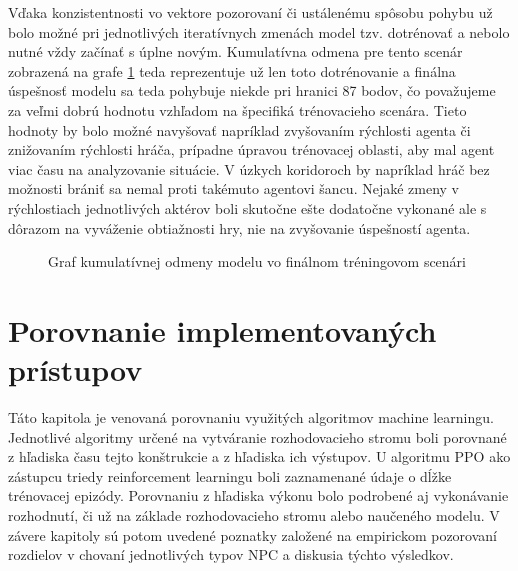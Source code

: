 \documentclass[slovak, master]{diploma}
\begin{document}
Vďaka konzistentnosti vo vektore pozorovaní či ustálenému spôsobu pohybu už bolo možné pri jednotlivých iteratívnych zmenách model tzv. dotrénovať a nebolo nutné vždy začínať s úplne novým. Kumulatívna odmena pre tento scenár zobrazená na grafe \ref{plt:finalScenario} teda reprezentuje už len toto dotrénovanie a finálna úspešnosť modelu sa teda pohybuje niekde pri hranici 87 bodov, čo považujeme za veľmi dobrú hodnotu vzhľadom na špecifiká trénovacieho scenára. Tieto hodnoty by bolo možné navyšovať napríklad zvyšovaním rýchlosti agenta či znižovaním rýchlosti hráča, prípadne úpravou trénovacej oblasti, aby mal agent viac času na analyzovanie situácie. V úzkych koridoroch by napríklad hráč bez možnosti brániť sa nemal proti takémuto agentovi šancu. Nejaké zmeny v rýchlostiach jednotlivých aktérov boli skutočne ešte dodatočne vykonané ale s dôrazom na vyváženie obtiažnosti hry, nie na zvyšovanie úspešností agenta. 
\begin{figure}[!htbp]
    \centering
    \caption{Graf kumulatívnej odmeny modelu vo finálnom tréningovom scenári}
    \label{plt:finalScenario}
\end{figure}


\chapter{Porovnanie implementovaných prístupov}
\label{sec:Compare}
Táto kapitola je venovaná porovnaniu využitých algoritmov machine learningu. Jednotlivé algoritmy určené na vytváranie rozhodovacieho stromu boli porovnané z hľadiska času tejto konštrukcie a z hľadiska ich výstupov. U algoritmu PPO ako zástupcu triedy reinforcement learningu boli zaznamenané údaje o dĺžke trénovacej epizódy. Porovnaniu z hľadiska výkonu bolo podrobené aj vykonávanie rozhodnutí, či už na základe rozhodovacieho stromu alebo naučeného modelu. V závere kapitoly sú potom uvedené poznatky založené na empirickom pozorovaní rozdielov v chovaní jednotlivých typov NPC a diskusia týchto výsledkov.
\end{document}
